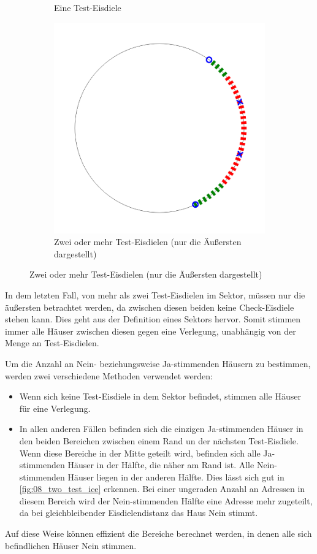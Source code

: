 \documentclass[a4paper,10pt,ngerman,captions=figureheading]{scrartcl}
\newcommand{\imageWidth}{0.3\linewidth}
\begin{document}
\begin{figure}[ht]
\begin{subfigure}[t]{\imageWidth}
        \caption{Eine Test-Eisdiele}
        \label{fig:07_one_test_ice}
    \end{subfigure}
    \begin{subfigure}[t]{\imageWidth}
        \includegraphics[width=\linewidth]{08_two_test_ice.png}
        \caption{Zwei oder mehr Test-Eisdielen (nur die Äußersten dargestellt)}
        \label{fig:08_two_test_ice}
    \end{subfigure}
\end{figure}

In dem letzten Fall, von mehr als zwei Test-Eisdielen im Sektor, müssen nur die äußersten betrachtet werden, da zwischen diesen beiden keine Check-Eisdiele stehen kann.
Dies geht aus der Definition eines Sektors hervor.
Somit stimmen immer alle Häuser zwischen diesen gegen eine Verlegung, unabhängig von der Menge an Test-Eisdielen.

Um die Anzahl an Nein- beziehungsweise Ja-stimmenden Häusern zu bestimmen, werden zwei verschiedene Methoden verwendet werden:
\begin{itemize}
    \item Wenn sich keine Test-Eisdiele in dem Sektor befindet, stimmen alle Häuser für eine Verlegung.
    \item In allen anderen Fällen befinden sich die einzigen Ja-stimmenden Häuser in den beiden Bereichen zwischen einem Rand un der nächsten Test-Eisdiele.
          Wenn diese Bereiche in der Mitte geteilt wird, befinden sich alle Ja-stimmenden Häuser in der Hälfte, die näher am Rand ist.
          Alle Nein-stimmenden Häuser liegen in der anderen Hälfte.
          Dies lässt sich gut in \autoref{fig:08_two_test_ice} erkennen.
          Bei einer ungeraden Anzahl an Adressen in diesem Bereich wird der Nein-stimmenden Hälfte eine Adresse mehr zugeteilt, da bei gleichbleibender Eisdielendistanz das Haus Nein stimmt.
\end{itemize}
Auf diese Weise können effizient die Bereiche berechnet werden, in denen alle sich befindlichen Häuser Nein stimmen.
\end{document}
